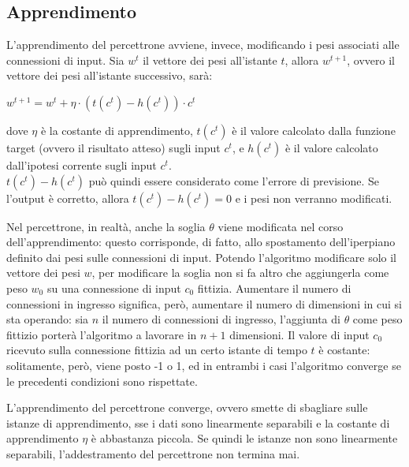 \subsection{Apprendimento}
L'apprendimento del percettrone avviene, invece, modificando i pesi associati alle connessioni di input.
Sia $w^t$ il vettore dei pesi all'istante $t$, allora $w^{t+1}$, ovvero il vettore dei pesi all'istante successivo, sarà:
\begin{center}
    $w^{t+1} = w^t + \eta \cdot (t(c^t) - h(c^t)) \cdot c^t$
\end{center}
dove $\eta$ è la costante di apprendimento, $t(c^t)$ è il valore calcolato dalla funzione target (ovvero il risultato atteso) sugli input $c^t$, e $h(c^t)$ è il valore calcolato dall'ipotesi corrente sugli input $c^t$.\\
$t(c^t) - h(c^t)$ può quindi essere considerato come l'errore di previsione. Se l'output è corretto, allora $t(c^t) - h(c^t) = 0$ e i pesi non verranno modificati.

Nel percettrone, in realtà, anche la soglia $\theta$ viene modificata nel corso dell'apprendimento: questo corrisponde, di fatto, allo spostamento dell'iperpiano definito dai pesi sulle connessioni di input.
Potendo l'algoritmo modificare solo il vettore dei pesi $w$, per modificare la soglia non si fa altro che aggiungerla come peso $w_0$ su una connessione di input $c_0$ fittizia. Aumentare il numero di connessioni in ingresso significa, però, aumentare il numero di dimensioni in cui si sta operando: sia $n$ il numero di connessioni di ingresso, l'aggiunta di $\theta$ come peso fittizio porterà l'algoritmo a lavorare in $n+1$ dimensioni.
Il valore di input $c_0$ ricevuto sulla connessione fittizia ad un certo istante di tempo $t$ è costante: solitamente, però, viene posto -1 o 1, ed in entrambi i casi l'algoritmo converge se le precedenti condizioni sono rispettate.

L'apprendimento del percettrone converge, ovvero smette di sbagliare sulle istanze di apprendimento, sse i dati sono linearmente separabili e la costante di apprendimento $\eta$ è abbastanza piccola.
Se quindi le istanze non sono linearmente separabili, l'addestramento del percettrone non termina mai.

